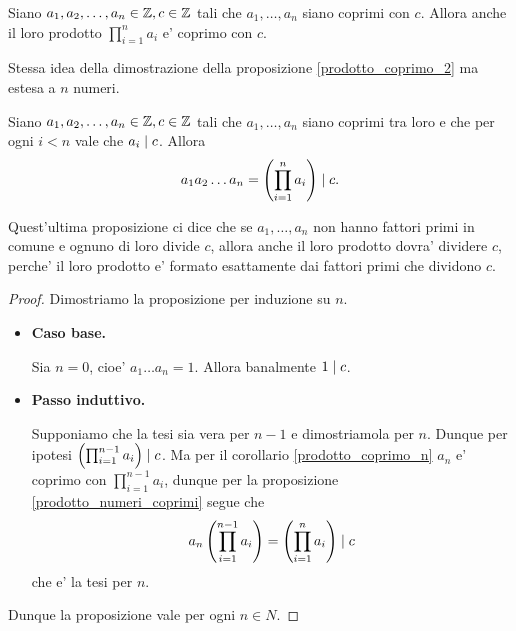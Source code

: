 \begin{corollary} \label{prodotto_coprimo_n}
    Siano $a_1, a_2, \dots, a_n \in \mathbb{Z}, c \in \mathbb{Z}$ tali che $a_1, \dots, a_n$ siano coprimi con $c$. Allora anche il loro prodotto $\prod_{i = 1}^{n} a_i$ e' coprimo con $c$.
\end{corollary}
\begin{intuition}
    Stessa idea della dimostrazione della proposizione \ref{prodotto_coprimo_2} ma estesa a $n$ numeri.
\end{intuition}

\begin{proposition}
    Siano $a_1, a_2, \dots, a_n \in \mathbb{Z}, c \in \mathbb{Z}$ tali che $a_1, \dots, a_n$ siano coprimi tra loro e che per ogni $i<n$ vale che $a_i \mid c$.
    Allora \begin{equation}
        a_1a_2\dots a_n = \left( \prod_{i = 1}^n a_i \right) \mid c.
    \end{equation}
\end{proposition}
\begin{intuition}
    Quest'ultima proposizione ci dice che se $a_1, \dots, a_n$ non hanno fattori primi in comune e ognuno di loro divide $c$, allora anche il loro prodotto dovra' dividere $c$, perche' il loro prodotto e' formato esattamente dai fattori primi che dividono $c$.
\end{intuition}
\begin{proof}
    Dimostriamo la proposizione per induzione su $n$.
    \begin{itemize}
        \item \textbf{Caso base.}

        Sia $n = 0$, cioe' $a_1\dots a_n = 1$. Allora banalmente $1 \mid c$.
        \item \textbf{Passo induttivo.}
        
        Supponiamo che la tesi sia vera per $n-1$ e dimostriamola per $n$. Dunque per ipotesi $ \left(\prod_{i = 1}^{n - 1} a_i\right) \mid c$.
        Ma per il corollario \ref{prodotto_coprimo_n} $a_n$ e' coprimo con $\prod_{i = 1}^{n - 1} a_i$, dunque per la proposizione \ref{prodotto_numeri_coprimi} segue che
        \begin{equation*}
            a_n \left(\prod_{i = 1}^{n - 1} a_i\right) = \left( \prod_{i = 1}^{n} a_i \right) \mid c
        \end{equation*}
        che e' la tesi per $n$.
    \end{itemize}
    Dunque la proposizione vale per ogni $n \in N$.
\end{proof}




